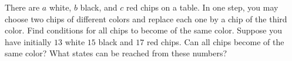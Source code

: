 There are $a$ white, $b$ black, and $c$ red chips on a table. In one step, you may choose two chips of different colors and replace each one by a chip of the third color. Find conditions for all chips to become of the same color. Suppose you have initially $13$ white $15$ black and $17$ red chips. Can all chips become of the same color? What states can be reached from these numbers?
